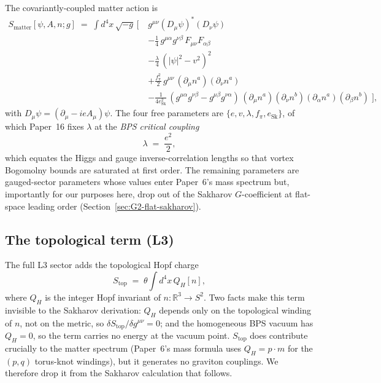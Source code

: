 \documentclass[11pt]{article}
\newcommand{\R}{\mathbb{R}}
\begin{document}
The covariantly-coupled matter action is
\begin{equation}
\begin{split}
S_{\mathrm{matter}}[\psi, A, n; g] \;=\; \int d^4 x\,\sqrt{-g}\,\Big[\;
    & g^{\mu\nu}(D_\mu\psi)^*(D_\nu\psi) \\
    & - \tfrac{1}{4}\,g^{\mu\alpha} g^{\nu\beta}\,F_{\mu\nu} F_{\alpha\beta} \\
    & - \tfrac{\lambda}{4}\,(|\psi|^2 - v^2)^2 \\
    & + \tfrac{f_\pi^2}{2}\,g^{\mu\nu}\,(\partial_\mu n^a)(\partial_\nu n^a) \\
    & - \tfrac{1}{4 e_{\mathrm{Sk}}^2}\,
       (g^{\mu\alpha} g^{\nu\beta} - g^{\mu\beta} g^{\nu\alpha})\,
       (\partial_\mu n^a)(\partial_\nu n^b)
       (\partial_\alpha n^a)(\partial_\beta n^b)
\;\Big],
\end{split}
\label{eq:Smatter-covariant}
\end{equation}
with $D_\mu \psi = (\partial_\mu - i e A_\mu)\psi$.  The four
free parameters are $\{e, v, \lambda, f_\pi, e_{\mathrm{Sk}}\}$, of
which Paper~16 fixes $\lambda$ at the \emph{BPS critical coupling}
\begin{equation}
  \lambda \;=\; \frac{e^2}{2},
  \label{eq:BPS-coupling}
\end{equation}
which equates the Higgs and gauge inverse-correlation lengths so
that vortex Bogomolny bounds are saturated at first order.  The
remaining parameters are gauged-sector parameters whose values
enter Paper~6's mass spectrum but, importantly for our purposes
here, drop out of the Sakharov $G$-coefficient at flat-space leading
order (Section~\ref{sec:G2-flat-sakharov}).

\subsection{The topological term (L3)}

The full L3 sector adds the topological Hopf charge
\begin{equation}
  S_{\mathrm{top}}\;=\;\theta\int d^4 x\,Q_H[n],
\end{equation}
where $Q_H$ is the integer Hopf invariant of $n: \R^3 \to S^2$.
Two facts make this term invisible to the Sakharov derivation:
$Q_H$ depends only on the topological winding of $n$, not on the
metric, so $\delta S_{\mathrm{top}}/\delta g^{\mu\nu} = 0$; and the
homogeneous BPS vacuum has $Q_H = 0$, so the term carries no
energy at the vacuum point.  $S_{\mathrm{top}}$ does contribute
crucially to the matter spectrum (Paper~6's mass formula uses
$Q_H = p\cdot m$ for the $(p,q)$ torus-knot windings), but it
generates no graviton couplings.  We therefore drop it from the
Sakharov calculation that follows.
\end{document}
